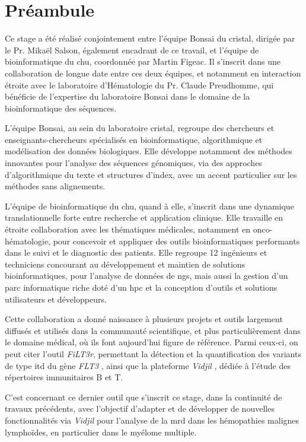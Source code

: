 \chapter{Préambule}

Ce stage a été réalisé conjointement entre l'équipe Bonsai du \gls{cristal}, 
dirigée par le Pr. Mikaël Salson, également encadrant de ce travail, 
et l'équipe de bioinformatique du \gls{chu}, coordonnée par Martin Figeac. 
Il s'inscrit dans une collaboration de longue date entre ces deux équipes, 
et notamment en interaction étroite avec le laboratoire d'Hématologie du Pr. Claude Preudhomme, 
qui bénéficie de l'expertise du laboratoire Bonsai dans le domaine de la bioinformatique 
des séquences.

\vspace{1em}

L'équipe Bonsai, au sein du laboratoire \gls{cristal}, regroupe des chercheurs et enseignants-chercheurs
spécialisés en bioinformatique, algorithmique et modélisation des données biologiques. 
Elle développe notamment des méthodes innovantes pour l'analyse des séquences génomiques, 
via des approches d'algorithmique du texte et structures d'index, avec un accent particulier 
sur les méthodes sans alignements. 

\vspace{1em}

L'équipe de bioinformatique du \gls{chu}, quand à elle, 
s'inscrit dans une dynamique translationnelle forte entre recherche et application clinique. 
Elle travaille en étroite collaboration avec les thématiques médicales, notamment en onco-hématologie, 
pour concevoir et appliquer des outils bioinformatiques performants dans le suivi et le diagnostic des patients.
Elle regroupe 12 ingénieurs et techniciens concourant au développement et maintien de solutions bioinformatiques,
pour l'analyse de données de \gls{ngs}, mais aussi la gestion d'un parc informatique riche doté 
d'un \gls{hpc} et la conception d'outils et solutions utilisateurs et développeurs.

\vspace{1em}

Cette collaboration a donné naissance à plusieurs projets et outils 
largement diffusés et utilisés dans la communauté scientifique, 
et plus particulièrement dans le domaine médical, où ils font aujourd'hui figure de référence. 
Parmi ceux-ci, on peut citer l'outil \textit{FiLT3r}, permettant la détection 
et la quantification des variants de type \gls{itd} du gène \textit{FLT3} \cite{boudryFrugalAlignmentfreeIdentification2022}, 
ainsi que la plateforme \textit{Vidjil} \cite{duezVidjilWebPlatform2016}, dédiée à l'étude des répertoires immunitaires B et T.

\vspace{1em}

C'est concernant ce dernier outil que s'inscrit ce stage, dans la continuité de travaux précédents,
avec l'objectif d'adapter et de développer de nouvelles fonctionnalités via \textit{Vidjil} 
pour l'analyse de la \gls{mrd} dans les hémopathies malignes lymphoïdes, en particulier dans le myélome multiple.